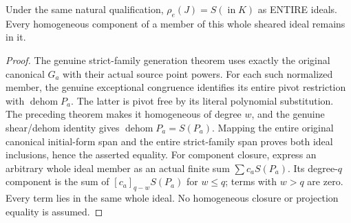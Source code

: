\begin{theorem}
\label{hir:actual-directional-whole-shadow-source-initial}
\leanok
Under the same natural qualification,
$\rho_e(J)=S(\operatorname{in}K)$ as ENTIRE ideals. Every homogeneous
component of a member of this whole sheared ideal remains in it.
\end{theorem}
\begin{proof}
The genuine strict-family generation theorem uses exactly the original
canonical $G_a$ with their actual source point powers. For each such
normalized member, the genuine exceptional congruence identifies its entire
pivot restriction with $\operatorname{dehom}P_a$. The latter is pivot free
by its literal polynomial substitution. The preceding theorem makes it
homogeneous of degree $w$, and the genuine shear/dehom identity gives
$\operatorname{dehom}P_a=S(P_a)$. Mapping the entire original canonical
initial-form span and the entire strict-family span proves both ideal
inclusions, hence the asserted equality. For component closure, express an
arbitrary whole ideal member as an actual finite sum $\sum c_a S(P_a)$.
Its degree-$q$ component is the sum of $[c_a]_{q-w}S(P_a)$ for $w\le q$;
terms with $w>q$ are zero. Every term lies in the same whole ideal.
No homogeneous closure or projection equality is assumed.
\end{proof}


